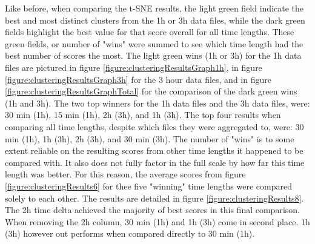 Like before, when comparing the t-SNE results, the light green field indicate the best and most distinct clusters from the 1h or 3h data files, while the dark green fields highlight the best value for that score overall for all time lengths. These green fields, or number of "wins" were summed to see which time length had the best number of scores the most. The light green wins (1h or 3h) for the 1h data files are pictured in figure \ref{figure:clusteringResultsGraph1h}, in figure \ref{figure:clusteringResultsGraph3h} for the 3 hour data files, and in figure \ref{figure:clusteringResultsGraphTotal} for the comparison of the dark green wins (1h and 3h). The two top winners for the 1h data files and the 3h data files, were: 30 min (1h), 15 min (1h), 2h (3h), and 1h (3h). The top four results when comparing all time lengths, despite which files they were aggregated to, were: 30 min (1h), 1h (3h), 2h (3h), and 30 min (3h). The number of "wins" is to some extent reliable on the resulting scores from other time lengths it happened to be compared with. It also does not fully factor in the full scale by how far this time length was better. For this reason, the average scores from figure \ref{figure:clusteringResults6} for thee five "winning" time lengths were compared solely to each other. The results are detailed in figure \ref{figure:clusteringResults8}. The 2h time delta achieved the majority of best scores in this final comparison. When removing the 2h column, 30 min (1h) and 1h (3h) come in second place. 1h (3h) however out performs when compared directly to 30 min (1h).








